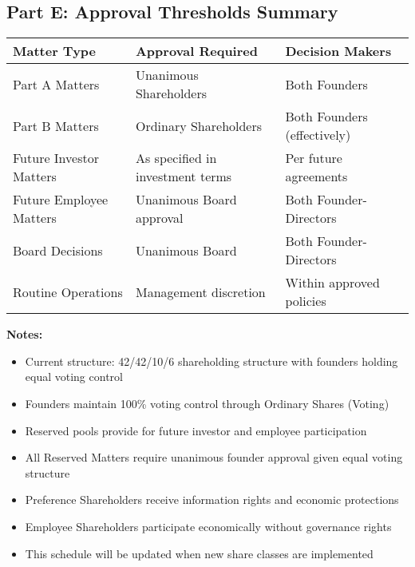 \subsection*{Part E: Approval Thresholds Summary}

\begin{tabularx}{\textwidth}{@{} l X l @{}}
\textbf{Matter Type} & \textbf{Approval Required} & \textbf{Decision Makers} \\
\hline
Part A Matters & Unanimous Shareholders & Both Founders \\
Part B Matters & Ordinary Shareholders & Both Founders (effectively) \\
Future Investor Matters & As specified in investment terms & Per future agreements \\
Future Employee Matters & Unanimous Board approval & Both Founder-Directors \\
Board Decisions & Unanimous Board & Both Founder-Directors \\
Routine Operations & Management discretion & Within approved policies \\
\hline
\end{tabularx}

\vspace{1em}

\textbf{Notes:}
\begin{itemize}
    \item Current structure: 42/42/10/6 shareholding structure with founders holding equal voting control
    \item Founders maintain 100\% voting control through Ordinary Shares (Voting)
    \item Reserved pools provide for future investor and employee participation
    \item All Reserved Matters require unanimous founder approval given equal voting structure
    \item Preference Shareholders receive information rights and economic protections
    \item Employee Shareholders participate economically without governance rights
    \item This schedule will be updated when new share classes are implemented
\end{itemize} 